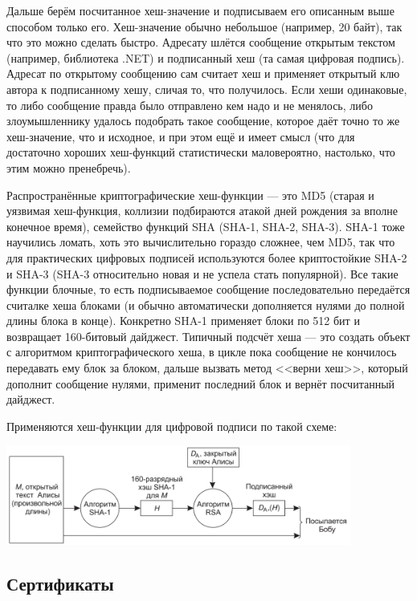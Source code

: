 \documentclass{../../text-style}
\begin{document}
Дальше берём посчитанное хеш-значение и подписываем его описанным выше способом только его. Хеш-значение обычно небольшое (например, 20 байт), так что это можно сделать быстро. Адресату шлётся сообщение открытым текстом (например, библиотека .NET) и подписанный хеш (та самая цифровая подпись). Адресат по открытому сообщению сам считает хеш и применяет открытый клю автора к подписанному хешу, сличая то, что получилось. Если хеши одинаковые, то либо сообщение правда было отправлено кем надо и не менялось, либо злоумышленнику удалось подобрать такое сообщение, которое даёт точно то же хеш-значение, что и исходное, и при этом ещё и имеет смысл (что для достаточно хороших хеш-функций статистически маловероятно, настолько, что этим можно пренебречь).

Распространённые криптографические хеш-функции --- это MD5 (старая и уязвимая хеш-функция, коллизии подбираются атакой дней рождения за вполне конечное время), семейство функций SHA (SHA-1, SHA-2, SHA-3). SHA-1 тоже научились ломать, хоть это вычислительно гораздо сложнее, чем MD5, так что для практических цифровых подписей используются более криптостойкие SHA-2 и SHA-3 (SHA-3 относительно новая и не успела стать популярной). Все такие функции блочные, то есть подписываемое сообщение последовательно передаётся считалке хеша блоками (и обычно автоматически дополняется нулями до полной длины блока в конце). Конкретно SHA-1 применяет блоки по 512 бит и возвращает 160-битовый дайджест. Типичный подсчёт хеша --- это создать объект с алгоритмом криптографического хеша, в цикле пока сообщение не кончилось передавать ему блок за блоком, дальше вызвать метод <<верни хеш>>, который дополнит сообщение нулями, применит последний блок и вернёт посчитанный дайджест.

Применяются хеш-функции для цифровой подписи по такой схеме:

\begin{center}
    \includegraphics[width=0.85\textwidth]{sha1Signature.png}
\end{center}

\subsection{Сертификаты}
\end{document}
